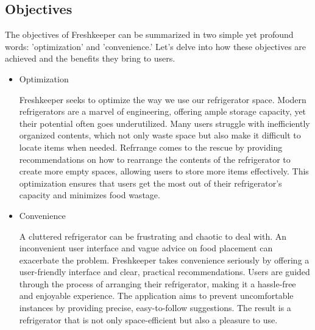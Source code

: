 \documentclass[conference]{IEEEtran}
\begin{document}
\subsection{Objectives}
The objectives of Freshkeeper can be summarized in two simple yet profound words: 'optimization' and 'convenience.' Let's delve into how these objectives are achieved and the benefits they bring to users.
\begin{itemize}
    \item Optimization\par
    Freshkeeper seeks to optimize the way we use our refrigerator space. Modern refrigerators are a marvel of engineering, offering ample storage capacity, yet their potential often goes underutilized. Many users struggle with inefficiently organized contents, which not only waste space but also make it difficult to locate items when needed. Refrrange comes to the rescue by providing recommendations on how to rearrange the contents of the refrigerator to create more empty spaces, allowing users to store more items effectively. This optimization ensures that users get the most out of their refrigerator's capacity and minimizes food wastage.
    \item Convenience\par
    A cluttered refrigerator can be frustrating and chaotic to deal with. An inconvenient user interface and vague advice on food placement can exacerbate the problem. Freshkeeper takes convenience seriously by offering a user-friendly interface and clear, practical recommendations. Users are guided through the process of arranging their refrigerator, making it a hassle-free and enjoyable experience. The application aims to prevent uncomfortable instances by providing precise, easy-to-follow suggestions. The result is a refrigerator that is not only space-efficient but also a pleasure to use.
\end{itemize}
\end{document}
